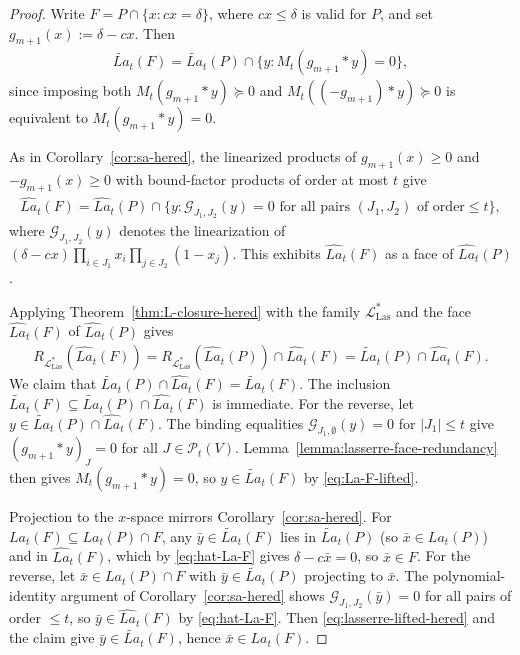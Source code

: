 \documentclass{article}
\renewcommand{\P}{\mathcal{P}}
\renewcommand{\L}{\mathcal{L}}
\begin{document}
\begin{proof}
    Write $F = P \cap \{x : cx = \delta\}$, where $cx \leq \delta$ is valid for $P$, and set $g_{m+1}(x) := \delta - cx$. Then
    \begin{align}
        \widetilde{La}_t(F) = \widetilde{La}_t(P) \cap \{y : M_t(g_{m+1} * y) = 0\}, \label{eq:La-F-lifted}
    \end{align}
    since imposing both $M_t(g_{m+1}*y) \succeq 0$ and $M_t((-g_{m+1})*y) \succeq 0$ is equivalent to $M_t(g_{m+1}*y) = 0$.

    As in Corollary~\ref{cor:sa-hered}, the linearized products of $g_{m+1}(x) \geq 0$ and $-g_{m+1}(x) \geq 0$ with bound-factor products of order at most $t$ give
    \begin{align}
        \widehat{La}_t(F) = \widehat{La}_t(P) \cap \{y : \mathcal{G}_{J_1, J_2}(y) = 0 \text{ for all pairs } (J_1, J_2) \text{ of order} \leq t\}, \label{eq:hat-La-F}
    \end{align}
    where $\mathcal{G}_{J_1, J_2}(y)$ denotes the linearization of $(\delta - cx)\prod_{i \in J_1}x_i \prod_{j \in J_2}(1-x_j)$.  This exhibits $\widehat{La}_t(F)$ as a face of $\widehat{La}_t(P)$. 

    Applying Theorem~\ref{thm:L-closure-hered} with the family $\L^*_{\mathrm{Las}}$ and the face $\widehat{La}_t(F)$ of $\widehat{La}_t(P)$ gives
    \begin{align}
        R_{\L^*_{\mathrm{Las}}}(\widehat{La}_t(F)) = R_{\L^*_{\mathrm{Las}}}(\widehat{La}_t(P)) \cap \widehat{La}_t(F) = \widetilde{La}_t(P) \cap \widehat{La}_t(F). \label{eq:lasserre-lifted-hered}
    \end{align}
    We claim that $\widetilde{La}_t(P) \cap \widehat{La}_t(F) = \widetilde{La}_t(F)$. The inclusion $\widetilde{La}_t(F) \subseteq \widetilde{La}_t(P) \cap \widehat{La}_t(F)$ is immediate. For the reverse, let $y \in \widetilde{La}_t(P) \cap \widehat{La}_t(F)$. The binding equalities $\mathcal{G}_{J_1, \emptyset}(y) = 0$ for $|J_1| \leq t$ give $(g_{m+1}*y)_J = 0$ for all $J \in \P_t(V)$. Lemma~\ref{lemma:lasserre-face-redundancy} then gives $M_t(g_{m+1}*y) = 0$, so $y \in \widetilde{La}_t(F)$ by \eqref{eq:La-F-lifted}.

    Projection to the $x$-space mirrors Corollary~\ref{cor:sa-hered}. For $La_t(F) \subseteq La_t(P) \cap F$, any $\bar y \in \widetilde{La}_t(F)$ lies in $\widetilde{La}_t(P)$ (so $\bar x \in La_t(P)$) and in $\widehat{La}_t(F)$, which by \eqref{eq:hat-La-F} gives $\delta - c\bar x = 0$, so $\bar x \in F$. For the reverse, let $\bar x \in La_t(P) \cap F$ with $\bar y \in \widetilde{La}_t(P)$ projecting to $\bar x$. The polynomial-identity argument of Corollary~\ref{cor:sa-hered} shows $\mathcal{G}_{J_1, J_2}(\bar y) = 0$ for all pairs of order $\leq t$, so $\bar y \in \widehat{La}_t(F)$ by \eqref{eq:hat-La-F}. Then \eqref{eq:lasserre-lifted-hered} and the claim give $\bar y \in \widetilde{La}_t(F)$, hence $\bar x \in La_t(F)$.
\end{proof}
\end{document}

